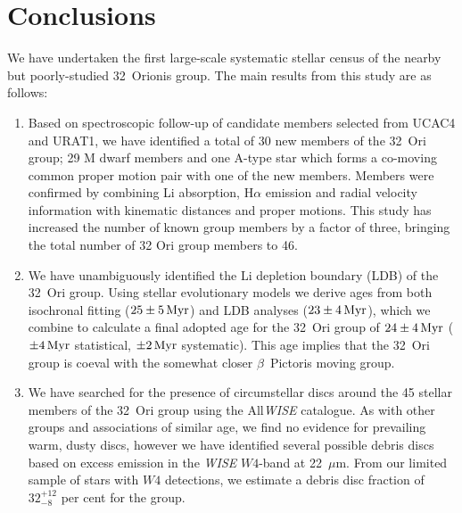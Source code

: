 \documentclass[usenatbib]{mnras}
\begin{document}
\section{Conclusions}
\label{conclusions}

We have undertaken the first large-scale systematic stellar census of
the nearby but poorly-studied 32~Orionis group. The main
results from this study are as follows:

\begin{enumerate}
  
\item Based on spectroscopic follow-up of candidate members selected
  from UCAC4 and URAT1, we have identified a total of 30 new members
  of the 32~Ori group; 29 M dwarf members and one A-type star which
  forms a co-moving common proper motion pair with one of the new members.
    Members were confirmed by combining Li
  absorption, H$\alpha$ emission and radial velocity information with
  kinematic distances and proper motions. This study has increased the
  number of known group members by a factor of three, bringing the
  total number of 32 Ori group members to 46.

\item We have unambiguously identified the Li depletion boundary (LDB)
  of the 32~Ori group. Using stellar evolutionary models we derive
  ages from both isochronal fitting ($25\pm5\,\rm{Myr}$) and LDB
  analyses ($23\pm4\,\rm{Myr}$), which we combine to calculate a final
  adopted age for the 32~Ori group of $24\pm4\,\rm{Myr}$
  ($\pm4\,\rm{Myr}$ statistical, $\pm2\,\rm{Myr}$ systematic). This
  age implies that the 32~Ori group is coeval with the somewhat closer
  $\beta$~Pictoris moving group.

\item We have searched for the presence of circumstellar discs around
  the 45 stellar members of the 32~Ori group using the
  All\emph{WISE} catalogue. As with other groups and associations of
  similar age, we find no evidence for prevailing warm, dusty discs,
  however we have identified several possible debris discs based on
  excess emission in the \emph{WISE} $W4$-band at 22~$\mu$m. From our
  limited sample of stars with $W4$ detections, we estimate a debris
  disc fraction of $32^{+12}_{-8}$ per cent for the group.
  
\end{enumerate}
\end{document}
